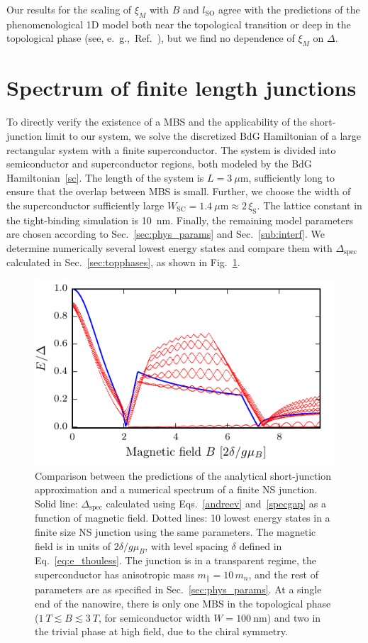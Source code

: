 Our results for the scaling of $\xi_M$ with $B$ and $l_\textrm{SO}$ agree with the predictions of the phenomenological 1D model both near the topological transition or deep in the topological phase (see, e.~g.,~Ref.~\cite{Klinovaja2012}), but we find no dependence of $\xi_M$ on $\Delta$.

\section{Spectrum of finite length junctions}
\label{sec:finite}

To directly verify the existence of a MBS and the applicability of the short-junction limit to our system, we solve the discretized BdG Hamiltonian of a large rectangular system with a finite superconductor.
The system is divided into semiconductor and superconductor regions, both modeled by the BdG Hamiltonian~\eqref{sc}.
The length of the system is $L=\SI{3}{\mu \m}$, sufficiently long to ensure that the overlap between MBS is small.
Further, we choose the width of the superconductor sufficiently large $W_\mathrm{SC}=\SI{1.4}{\mu\m} \approx 2\,\xi_\mathrm S$.
The lattice constant in the tight-binding simulation is \SI{10}{\nm}.
Finally, the remaining model parameters are chosen according to Sec.~\ref{sec:phys_params} and Sec.~\ref{sub:interf}.
We determine numerically several lowest energy states and compare them with $\Delta_\textrm{spec}$ calculated in Sec.~\ref{sec:topphases}, as shown in Fig.~\ref{fig:finite}.

\begin{figure}
\begin{center}
\includegraphics[width=0.7\columnwidth]{chapter_shortjunction/figures/finite}
\caption{Comparison between the predictions of the analytical short-junction approximation and a numerical spectrum of a finite NS junction.
Solid line: $\Delta_\textrm{spec}$ calculated using Eqs.~\eqref{andreev} and~\eqref{specgap} as a function of magnetic field.
Dotted lines: 10 lowest energy states in a finite size NS junction using the same parameters.
The magnetic field is in units of $2\delta/g\mu_B$, with level spacing $\delta$ defined in Eq.~\eqref{eq:e_thouless}.
The junction is in a transparent regime, the superconductor has anisotropic mass $m_\parallel = 10\, m_n$, and the rest of parameters are as specified in Sec.~\ref{sec:phys_params}.
At a single end of the nanowire, there is only one MBS in the topological phase ($\SI{1}{T}\lesssim B \lesssim \SI{3}{T}$, for semiconductor width $W=\SI{100}{\nm}$) and two in the trivial phase at high field, due to the chiral symmetry.}
\label{fig:finite}
\end{center}
\end{figure}


